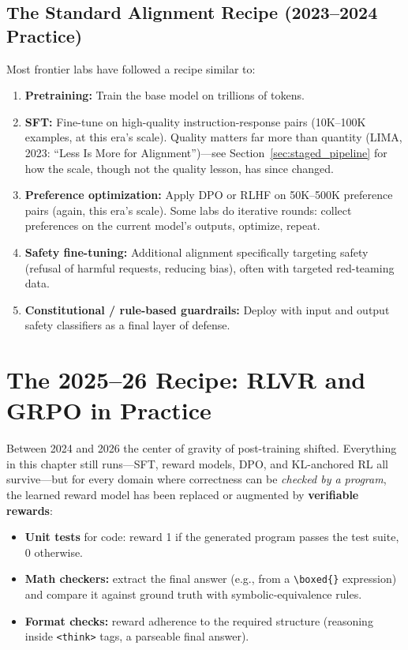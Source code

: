 \subsection{The Standard Alignment Recipe (2023--2024 Practice)}

Most frontier labs have followed a recipe similar to:

\begin{enumerate}[leftmargin=*]
\item \textbf{Pretraining:} Train the base model on trillions of tokens.
\item \textbf{SFT:} Fine-tune on high-quality instruction-response pairs
  (10K--100K examples, at this era's scale). Quality matters far more than
  quantity (LIMA, 2023: ``Less Is More for Alignment'')---see
  Section~\ref{sec:staged_pipeline} for how the scale, though not the
  quality lesson, has since changed.
\item \textbf{Preference optimization:} Apply DPO or RLHF on 50K--500K
  preference pairs (again, this era's scale).  Some labs do iterative
  rounds: collect preferences on the current model's outputs, optimize,
  repeat.
\item \textbf{Safety fine-tuning:} Additional alignment specifically
  targeting safety (refusal of harmful requests, reducing bias), often
  with targeted red-teaming data.
\item \textbf{Constitutional / rule-based guardrails:} Deploy with input
  and output safety classifiers as a final layer of defense.
\end{enumerate}


\section{The 2025--26 Recipe: RLVR and GRPO in Practice}
\label{sec:rlvr_practice}

Between 2024 and 2026 the center of gravity of post-training shifted.
Everything in this chapter still runs---SFT, reward models, DPO, and
KL-anchored RL all survive---but for every domain where correctness can be
\emph{checked by a program}, the learned reward model has been replaced or
augmented by \textbf{verifiable rewards}:

\begin{itemize}[leftmargin=*]
\item \textbf{Unit tests} for code: reward 1 if the generated program
  passes the test suite, 0 otherwise.
\item \textbf{Math checkers:} extract the final answer (e.g., from a
  \texttt{\textbackslash boxed\{\}} expression) and compare it against
  ground truth with symbolic-equivalence rules.
\item \textbf{Format checks:} reward adherence to the required structure
  (reasoning inside \texttt{<think>} tags, a parseable final answer).
\end{itemize}

